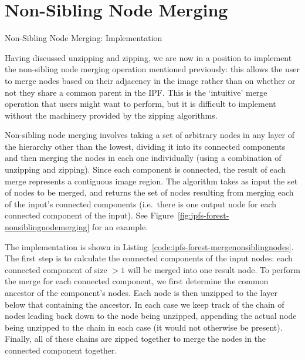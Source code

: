 \documentclass[10pt,twocolumn,twoside]{IEEEtran}
\begin{document}

\section{Non-Sibling Node Merging}
\label{sec:nsmerge}

\begin{stulisting}[t]
\caption{Non-Sibling Node Merging: Implementation}
\label{code:ipfs-forest-mergenonsiblingnodes}

\end{stulisting}

Having discussed unzipping and zipping, we are now in a position to implement the non-sibling node merging operation mentioned previously: this allows the user to merge nodes based on their adjacency in the image rather than on whether or not they share a common parent in the IPF. This is the `intuitive' merge operation that users might want to perform, but it is difficult to implement without the machinery provided by the zipping algorithms.

Non-sibling node merging involves taking a set of arbitrary nodes in any layer of the hierarchy other than the lowest, dividing it into its connected components and then merging the nodes in each one individually (using a combination of unzipping and zipping). Since each component is connected, the result of each merge represents a contiguous image region. The algorithm takes as input the set of nodes to be merged, and returns the set of nodes resulting from merging each of the input's connected components (i.e.~there is one output node for each connected component of the input). See Figure~\ref{fig:ipfs-forest-nonsiblingnodemerging} for an example.

The implementation is shown in Listing~\ref{code:ipfs-forest-mergenonsiblingnodes}. The first step is to calculate the connected components of the input nodes: each connected component of size $> 1$ will be merged into one result node. To perform the merge for each connected component, we first determine the common ancestor of the component's nodes. Each node is then unzipped to the layer below that containing the ancestor. In each case we keep track of the chain of nodes leading back down to the node being unzipped, appending the actual node being unzipped to the chain in each case (it would not otherwise be present). Finally, all of these chains are zipped together to merge the nodes in the connected component together.
\end{document}
